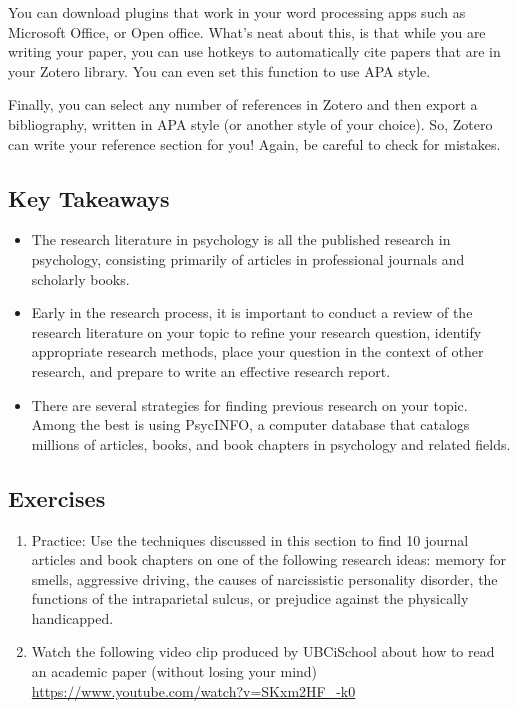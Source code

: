 \documentclass[]{book}
\theoremstyle{definition}
\theoremstyle{definition}
\theoremstyle{remark}
\begin{document}
You can download plugins that work in your word processing apps such as
Microsoft Office, or Open office. What's neat about this, is that while
you are writing your paper, you can use hotkeys to automatically cite
papers that are in your Zotero library. You can even set this function
to use APA style.

Finally, you can select any number of references in Zotero and then
export a bibliography, written in APA style (or another style of your
choice). So, Zotero can write your reference section for you! Again, be
careful to check for mistakes.

\subsection{Key Takeaways}\label{key-takeaways-6}

\begin{itemize}
\item
  The research literature in psychology is all the published research in
  psychology, consisting primarily of articles in professional journals
  and scholarly books.
\item
  Early in the research process, it is important to conduct a review of
  the research literature on your topic to refine your research
  question, identify appropriate research methods, place your question
  in the context of other research, and prepare to write an effective
  research report.
\item
  There are several strategies for finding previous research on your
  topic. Among the best is using PsycINFO, a computer database that
  catalogs millions of articles, books, and book chapters in psychology
  and related fields.
\end{itemize}

\subsection{Exercises}\label{exercises-6}

\begin{enumerate}
\def\labelenumi{\arabic{enumi}.}
\item
  Practice: Use the techniques discussed in this section to find 10
  journal articles and book chapters on one of the following research
  ideas: memory for smells, aggressive driving, the causes of
  narcissistic personality disorder, the functions of the intraparietal
  sulcus, or prejudice against the physically handicapped.
\item
  Watch the following video clip produced by UBCiSchool about how to
  read an academic paper (without losing your mind)
  \url{https://www.youtube.com/watch?v=SKxm2HF_-k0}
\end{enumerate}
\end{document}
